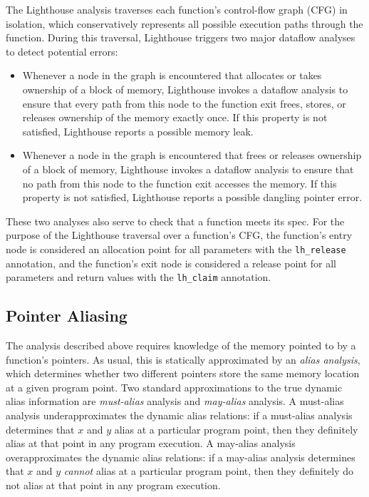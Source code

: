 The Lighthouse analysis traverses each function's control-flow graph (CFG)
in isolation, which conservatively represents all possible execution paths
through the function.  
%
During this traversal, Lighthouse triggers two major dataflow analyses to
detect potential errors:



\begin{itemize}

\item Whenever a node in the graph is encountered that allocates or takes
ownership of a block of memory, Lighthouse invokes a dataflow analysis to
ensure that every path from this node to the function exit frees, stores, or
releases ownership of the memory exactly once.  
%
If this property is not satisfied, Lighthouse reports a possible memory
leak.

\item Whenever a node in the graph is encountered that frees or releases
ownership of a block of memory, Lighthouse invokes a dataflow analysis to
ensure that no path from this node to the function exit accesses the memory.  
%
If this property is not satisfied, Lighthouse reports a possible dangling
pointer error.

\end{itemize}



These two analyses also serve to check that a function meets its spec.  
%
For the purpose of the Lighthouse traversal over a function's CFG, the
function's entry node is considered an allocation point for all parameters
with the {\tt lh\_release} annotation, and the function's exit node is
considered a release point for all parameters and return values with the
{\tt lh\_claim} annotation.  



\subsection{Pointer Aliasing}



The analysis described above requires knowledge of the memory pointed to by
a function's pointers.  
%
As usual, this is statically approximated by an {\em alias analysis}, which
determines whether two different pointers store the same memory location at
a given program point.  
%
Two standard approximations to the true dynamic alias information are {\em
must-alias} analysis and {\em may-alias} analysis.  
%
A must-alias analysis underapproximates the dynamic alias relations:  if a
must-alias analysis determines that $x$ and $y$ alias at a particular
program point, then they definitely alias at that point in any program
execution.  
%
A may-alias analysis overapproximates the dynamic alias relations:  if a
may-alias analysis determines that $x$ and $y$ {\em cannot} alias at a
particular program point, then they definitely do not alias at that point in
any program execution.



